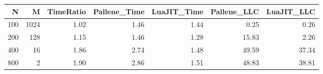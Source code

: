 \begin{tabular}{rrrrrrr}
  \toprule
N & M & TimeRatio & Pallene\_Time & LuaJIT\_Time & Pallene\_LLC & LuaJIT\_LLC \\ 
  \midrule
100 & 1024 & 1.02 & 1.46 & 1.44 & 0.25 & 0.26 \\ 
  200 & 128 & 1.15 & 1.46 & 1.28 & 15.83 & 2.26 \\ 
  400 &  16 & 1.86 & 2.74 & 1.48 & 49.59 & 37.34 \\ 
  800 &   2 & 1.90 & 2.86 & 1.51 & 48.83 & 38.81 \\ 
   \bottomrule
\end{tabular}

